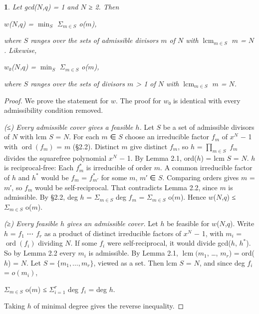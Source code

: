 \documentclass[pdflatex,sn-mathphys-num]{sn-jnl}
\theoremstyle{thmstyleone}
\newcommand{\thmxname}{}
\newtheorem*{thmxinner}{\thmxname}
\newenvironment{thmx}[1]{\renewcommand{\thmxname}{#1}\begin{thmxinner}}{\end{thmxinner}}
\theoremstyle{thmstylethree}
\begin{document}
\begin{thmx}{Proposition 4.2 (lcm-cover form)}

Let gcd(\(N\),\(q\)) = 1 and \(N\) ≥ 2. Then

\begin{center}\(w\)(\(N\),\(q\)) = \(\operatorname{min}_S\) \(Σ_{m∈S}\) o(\(m\)),\end{center}

where \(S\) ranges over the sets of admissible divisors \(m\) of \(N\) with \(\operatorname{lcm}_{m∈S}\) \(m\) = \(N\). Likewise,

\begin{center}\(w\)₀(\(N\),\(q\)) = \(\operatorname{min}_S\) \(Σ_{m∈S}\) o(\(m\)),\end{center}

where \(S\) ranges over the sets of divisors \(m\) \textgreater{} 1 of \(N\) with \(\operatorname{lcm}_{m∈S}\) \(m\) = \(N\).

\end{thmx}

\begin{proof}[Proof]

We prove the statement for \(w\). The proof for \(w\)₀ is identical with every admissibility condition removed.

\emph{(≤) Every admissible cover gives a feasible \(h\).} Let \(S\) be a set of admissible divisors of \(N\) with lcm \(S\) = \(N\). For each \(m\) ∈ \(S\) choose an irreducible factor \(f_m\) of \(x^N\) − 1 with \(\operatorname{ord}(f_m)\) = \(m\) (§2.2). Distinct \(m\) give distinct \(f_m\), so \(h\) = \(∏_{m∈S}\) \(f_m\) divides the squarefree polynomial \(x^N\) − 1. By Lemma 2.1, ord(\(h\)) = lcm \(S\) = \(N\). \(h\) is reciprocal-free: Each \(f_m^{*}\) is irreducible of order \(m\). A common irreducible factor of \(h\) and \(h^{*}\) would be \(f_m\) = \(f_{m′}^{*}\) for some \(m\), \(m\)′ ∈ \(S\). Comparing orders gives \(m\) = \(m\)′, so \(f_m\) would be self-reciprocal. That contradicts Lemma 2.2, since \(m\) is admissible.
By §2.2, deg \(h\) = \(Σ_{m∈S}\) deg \(f_m\) = \(Σ_{m∈S}\) o(\(m\)). Hence \(w\)(\(N\),\(q\)) ≤ \(Σ_{m∈S}\) o(\(m\)).

\emph{(≥) Every feasible \(h\) gives an admissible cover.} Let \(h\) be feasible for \(w\)(\(N\),\(q\)). Write \(h\) = \(f_1\) ⋯ \(f_r\) as a product of distinct irreducible factors of \(x^N\) − 1, with \(m_i\) = \(\operatorname{ord}(f_i)\) dividing \(N\). If some \(f_i\) were self-reciprocal, it would divide gcd(\(h\), \(h^{*}\)). So by Lemma 2.2 every \(m_i\) is admissible. By Lemma 2.1, \(\operatorname{lcm}(m_1\), \ldots, \(m_r\)) = ord(\(h\)) = \(N\). Let \(S=\{m_1,\ldots,m_r\}\), viewed as a set. Then lcm \(S\) = \(N\), and since deg \(f_i\) = \(o(m_i)\),

\begin{center}\(Σ_{m∈S}\) o(\(m\)) ≤ \(Σ_{i=1}^r\) deg \(f_i\) = deg \(h\).\end{center}

Taking \(h\) of minimal degree gives the reverse inequality.

\end{proof}
\end{document}
